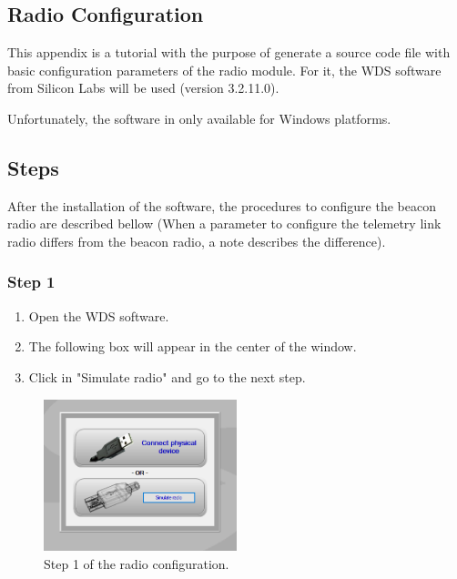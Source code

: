 \documentclass[12pt]{book}
\begin{document}
\begin{appendices}

\chapter{Radio Configuration}

This appendix is a tutorial with the purpose of generate a source code file with basic configuration parameters of the radio module. For it, the WDS software from Silicon Labs will be used (version 3.2.11.0).

Unfortunately, the software in only available for Windows platforms.

\section{Steps}

After the installation of the software, the procedures to configure the beacon radio are described bellow (When a parameter to configure the telemetry link radio differs from the beacon radio, a note describes the difference).

\subsection{Step 1}

\begin{enumerate}
    \item Open the WDS software.
    \item The following box will appear in the center of the window.
    \item Click in "Simulate radio" and go to the next step.
\end{enumerate}

\begin{figure}[!h]
	\begin{center}
		\includegraphics[width=0.5\textwidth]{figures/wds-tutorial-1.png}
		\caption{Step 1 of the radio configuration.}
		\label{fig:wds-tutorial-step-1}
	\end{center}
\end{figure}


\end{appendices}
\end{document}
